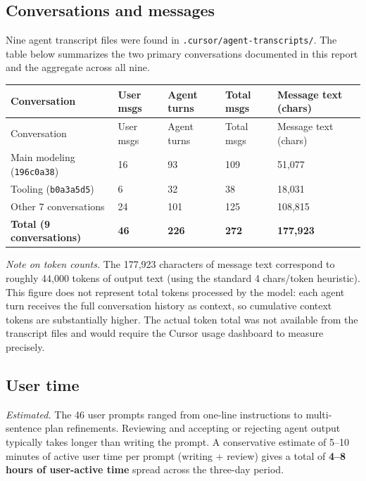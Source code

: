 \documentclass[11pt]{article}
\begin{document}
\subsection{Conversations and messages}

Nine agent transcript files were found in \texttt{.cursor/agent-transcripts/}. The table below summarizes the two primary conversations documented in this report and the aggregate across all nine.

\begin{longtable}{@{}p{3.4cm}p{2.2cm}p{2.2cm}p{2.2cm}p{2.8cm}@{}}
\toprule
Conversation & User msgs & Agent turns & Total msgs & Message text (chars) \\
\midrule
\endfirsthead
\toprule
Conversation & User msgs & Agent turns & Total msgs & Message text (chars) \\
\midrule
\endhead
Main modeling (\texttt{196c0a38}) & 16 & 93 & 109 & 51{,}077 \\
Tooling (\texttt{b0a3a5d5}) & 6 & 32 & 38 & 18{,}031 \\
Other 7 conversations & 24 & 101 & 125 & 108{,}815 \\
\midrule
\textbf{Total (9 conversations)} & \textbf{46} & \textbf{226} & \textbf{272} & \textbf{177{,}923} \\
\bottomrule
\end{longtable}

\noindent \textit{Note on token counts.} The 177{,}923 characters of message text correspond to roughly 44{,}000 tokens of output text (using the standard 4 chars/token heuristic). This figure does not represent total tokens processed by the model: each agent turn receives the full conversation history as context, so cumulative context tokens are substantially higher. The actual token total was not available from the transcript files and would require the Cursor usage dashboard to measure precisely.

\subsection{User time}

\textit{Estimated.} The 46 user prompts ranged from one-line instructions to multi-sentence plan refinements. Reviewing and accepting or rejecting agent output typically takes longer than writing the prompt. A conservative estimate of 5--10 minutes of active user time per prompt (writing + review) gives a total of \textbf{4--8 hours of user-active time} spread across the three-day period.
\end{document}
